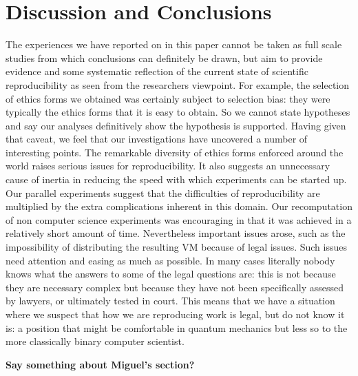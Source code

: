 \section{Discussion and Conclusions}
\label{s:discussion}

The experiences we have reported on in this paper cannot be taken as full scale studies from which conclusions can definitely be drawn, but aim to provide evidence and some systematic reflection of the current state of scientific reproducibility as seen from the researchers viewpoint.  For example, the 
selection of ethics forms we obtained was certainly subject to selection bias: they were typically the ethics forms that it is easy to obtain.  So we cannot state hypotheses and say our analyses definitively show the hypothesis is supported.   Having given that caveat, we feel that our investigations have uncovered a number of interesting points.  The remarkable diversity of ethics forms enforced around the world raises serious issues for reproducibility.  It also suggests an unnecessary cause of inertia in reducing the speed with which experiments can be started up.  Our parallel experiments suggest that the difficulties of reproducibility are 
multiplied by the extra complications inherent in this domain.  Our
recomputation of non computer science experiments was encouraging in
that it was achieved in a relatively short amount of time.
Nevertheless important issues arose, such as the impossibility of
distributing the resulting VM because of legal issues. 
Such issues need attention and easing as much as possible.  In many cases literally nobody knows what the answers to some of the legal questions are: this is not because they are necessary complex but because they have not been specifically assessed by lawyers, or ultimately tested in court.  This means that we have a situation where we suspect that how we are reproducing work is legal, but do not know it is: a position that might be comfortable in quantum mechanics but less so to the more classically binary computer scientist. 

\textbf{Say something about Miguel's section?}



